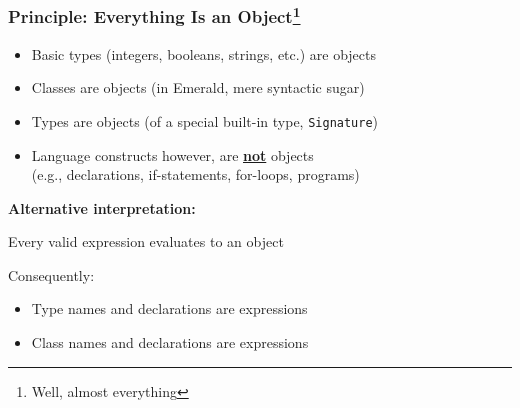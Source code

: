 \begin{frame}

\frametitle{Principle: Everything Is an Object\footnote{Well, almost
everything}}

\begin{itemize}

\item Basic types (integers, booleans, strings, etc.) are objects

\item Classes are objects (in Emerald, mere syntactic sugar)

\item Types are objects (of a special built-in type, \texttt{Signature})

\item Language constructs however, are \textbf{\underline{not}}
objects \\ (e.g., declarations, if-statements, for-loops, programs)

\end{itemize}

\vspace{\fill}

\textbf{Alternative interpretation:}

Every valid expression evaluates to an object

\vspace{\fill}

Consequently:

\begin{itemize}

\item Type names and declarations are expressions

\item Class names and declarations are expressions

\end{itemize}

\end{frame}

% 
% 
% 
% 
% 
% 
% 
% 
% 
% 
% 
% 
